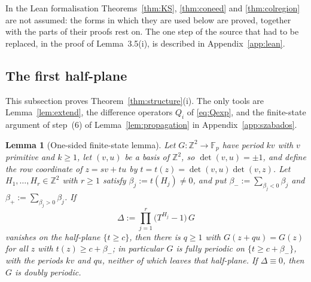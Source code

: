 \documentclass[11pt,reqno]{amsart}
\theoremstyle{plain}
\newtheorem{lem}[thm]{Lemma}
\theoremstyle{definition}
\theoremstyle{remark}
\theoremstyle{plain}
\theoremstyle{remark}
\theoremstyle{definition}
\numberwithin{equation}{section}
\newcommand{\Z}{\mathbb{Z}}
\newcommand{\Fp}{\mathbb{F}_p}
\begin{document}
In the Lean formalisation Theorems~\ref{thm:KS}, \ref{thm:coneed} and
\ref{thm:colregion} are not assumed: the forms in which they are used below are
proved, together with the parts of \cite{Colle23a} their proofs rest on.  The one step of the source that had to
be replaced, in the proof of Lemma~3.5(i), is described in
Appendix~\ref{app:lean}.

\subsection{The first half-plane}\label{ssec:firsthalf}

This subsection proves Theorem~\ref{thm:structure}(i).  The only tools are
Lemma~\ref{lem:extend}, the difference operators $Q_i$ of \eqref{eq:Qexp}, and
the finite-state argument of step~(6) of Lemma~\ref{lem:propagation} in
Appendix~\ref{app:szabados}.

\begin{lem}[One-sided finite-state lemma]\label{lem:finitestate}
Let $G\colon\Z^2\to\Fp$ have period $kv$ with $v$ primitive and $k\ge1$, let
$(v,u)$ be a basis of $\Z^2$, so $\det(v,u)=\pm1$, and define the row coordinate
of $z=sv+tu$ by $t=t(z)=\det(v,u)\det(v,z)$.  Let
$H_1,\dots,H_r\in\Z^2$ with $r\ge1$ satisfy $\beta_j:=t(H_j)\ne0$, and put
$\beta_-:=\sum_{\beta_j<0}\beta_j$ and $\beta_+:=\sum_{\beta_j>0}\beta_j$.  If
\[\Delta:=\prod_{j=1}^r\bigl(T^{H_j}-1\bigr)\,G\]
vanishes on the half-plane $\{t\ge c\}$, then there is $q\ge1$ with
$G(z+qu)=G(z)$ for all $z$ with $t(z)\ge c+\beta_-$; in particular $G$ is fully
periodic on $\{t\ge c+\beta_-\}$, with the periods $kv$ and $qu$, neither of
which leaves that half-plane.  If $\Delta\equiv0$, then $G$ is doubly periodic.
\end{lem}
\end{document}

